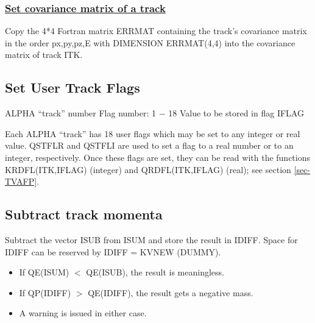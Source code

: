 \subsubsection{\underline{Set covariance matrix of a track}}
\par
{}
\par
\par
Copy the 4*4 Fortran matrix ERRMAT
containing the track's covariance
matrix in the order px,py,pz,E with DIMENSION ERRMAT(4,4) into the
covariance matrix of track ITK.
\par
\subsection{\label{sec-USFL}Set User Track Flags}
\par
{}
\par
\par
\begin{indentlist}{ 3.25cm}{ 3.50cm}
ALPHA ``track'' number
Flag number: 1 $-$ 18
Value to be stored in flag IFLAG
\end{indentlist}
Each ALPHA ``track'' has 18 user flags which may be set to any integer
or real value. QSTFLR and QSTFLI are used to set a flag to a real
number
or to an integer, respectively.
Once these flags are set, they can be read with
the functions KRDFL(ITK,IFLAG) (integer) and QRDFL(ITK,IFLAG)
(real); see section \ref{sec-TVAFP}.
\par
\subsection{\label{sec-QVSU}Subtract track momenta}
\par
{}
\par
\par
Subtract the vector ISUB from ISUM and store the result in
IDIFF. Space for IDIFF can be reserved by IDIFF = KVNEW (DUMMY).
\begin{itemize}
\item If QE(ISUM) $<$ QE(ISUB), the result is meaningless.
\item If QP(IDIFF) $>$ QE(IDIFF), the result gets a negative mass.
\item A warning is issued in either case.
\end{itemize}
 

